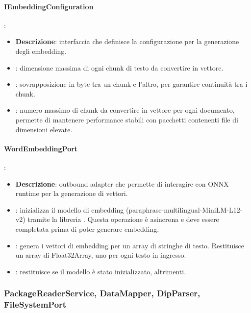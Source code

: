 \paragraph{IEmbeddingConfiguration}:
\begin{itemize}
    \item \textbf{Descrizione}: interfaccia che definisce la configurazione per la generazione degli embedding.
    \item {}: dimensione massima di ogni chunk di testo da convertire in vettore.
    \item {}: sovrapposizione in byte tra un chunk e l'altro, per garantire continuità tra i chunk.
    \item {}: numero massimo di chunk da convertire in vettore per ogni documento, permette di mantenere performance stabili con pacchetti contenenti file di dimensioni elevate.
\end{itemize}

\paragraph{WordEmbeddingPort}:
\begin{itemize}
    \item \textbf{Descrizione}: outbound adapter che permette di interagire con ONNX runtime per la generazione di vettori.
    \item {}: inizializza il modello di embedding (paraphrase-multilingual-MiniLM-L12-v2) tramite la libreria . Questa operazione è asincrona e deve essere completata prima di poter generare embedding.
    \item {}: genera i vettori di embedding per un array di stringhe di testo. Restituisce un array di Float32Array, uno per ogni testo in ingresso.
    \item {}: restituisce  se il modello è stato inizializzato,  altrimenti.
\end{itemize}

\subsubsection{PackageReaderService, DataMapper, DipParser, FileSystemPort}

